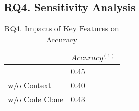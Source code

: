 %
%			

\subsection{RQ4. Sensitivity Analysis}


\begin{table}[t]
	\caption{RQ4. Impacts of Key Features on Accuracy}
	\vspace{-0.1in}
	\begin{center}
		\footnotesize
		\tabcolsep 4pt
		\renewcommand{\arraystretch}{1} \begin{tabular}{p{3cm}<{\centering}|p{2cm}<{\centering}}
			
			\hline
			                         & $Accuracy^{(1)}$\\
			\hline
			\tool                    &     0.45          \\
			\tool w/o Context        &     0.40          \\
			\tool w/o Code Clone     &     0.43         \\
			\hline
		\end{tabular}
		\label{RQ4-result-1}
	\end{center}
\end{table}



